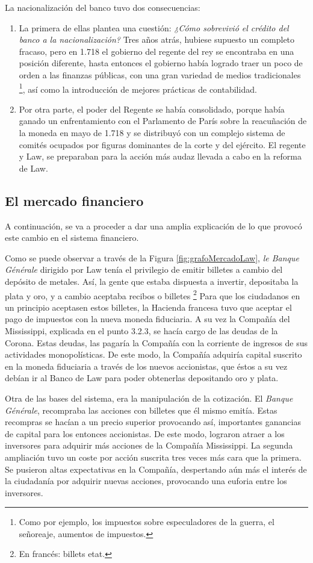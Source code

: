 La nacionalización del banco tuvo dos consecuencias:
\begin{enumerate}
	\item La primera de ellas plantea una cuestión: \emph{¿Cómo sobrevivió el crédito del banco a la nacionalización?} Tres años atrás, hubiese supuesto un completo fracaso, pero en 1.718 el gobierno del regente del rey se encontraba en una posición diferente, hasta entonces el gobierno había logrado traer un poco de orden a las finanzas públicas, con una gran variedad de medios tradicionales \footnote{Como por ejemplo, los impuestos sobre especuladores de la guerra, el señoreaje, aumentos de impuestos.}, así como la introducción de mejores prácticas de contabilidad.
	\item Por otra parte, el poder del Regente se había consolidado, porque había ganado un enfrentamiento con el Parlamento de París sobre la reacuñación de la moneda en mayo de 1.718 y se distribuyó con un complejo sistema de comités ocupados por figuras dominantes de la corte y del ejército. El regente y Law, se preparaban para la acción más audaz llevada a cabo en la reforma de Law.
\end{enumerate}


\subsection{El mercado financiero}

A continuación, se va a proceder a dar una amplia explicación de lo que provocó este cambio en el sistema financiero.

Como se puede observar a través de la Figura \ref{fig:grafoMercadoLaw}, \emph{le Banque Générale} dirigido por Law tenía el privilegio de emitir billetes a cambio del depósito de metales. Así, la gente que estaba dispuesta a invertir, depositaba la plata y oro, y a cambio aceptaba recibos o billetes 	\footnote{En francés: billets etat.} Para que los ciudadanos en un principio aceptasen estos billetes, la Hacienda francesa tuvo que aceptar el pago de impuestos con la nueva moneda fiduciaria. A su vez la Compañía del Mississippi, explicada en el punto 3.2.3, se hacía cargo de las deudas de la Corona. Estas deudas, las pagaría la Compañía con la corriente de ingresos de sus actividades monopolísticas. De este modo, la Compañía adquiría capital suscrito en la moneda fiduciaria a través de los nuevos accionistas, que éstos a su vez debían ir al Banco de Law para poder obtenerlas depositando oro y plata. 

Otra de las bases del sistema, era la manipulación de la cotización. El \emph{Banque Générale}, recompraba las acciones con billetes que él mismo emitía. Estas recompras se hacían a un precio superior provocando así, importantes ganancias de capital para los entonces accionistas. De este modo, lograron atraer a los inversores para adquirir más acciones de la Compañía Mississippi. La segunda ampliación tuvo un coste por acción suscrita tres veces más cara que la primera. Se pusieron altas expectativas en la Compañía, despertando aún más el interés de la ciudadanía por adquirir nuevas acciones, provocando una euforia entre los inversores. 

